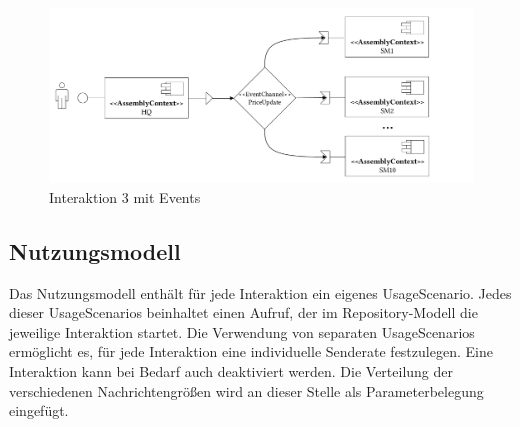 \begin{figure}
\center
  \includegraphics[width=1\textwidth]{images/evaluation/specjms/evaluationInteraktion3events.pdf}
  \caption{Interaktion 3 mit Events}
  \label{img:interaction3system}
\end{figure}


\subsection{Nutzungsmodell}
Das Nutzungsmodell enthält für jede Interaktion ein eigenes UsageScenario. Jedes dieser UsageScenarios beinhaltet einen Aufruf, der im Repository-Modell die jeweilige Interaktion startet. Die Verwendung von separaten UsageScenarios ermöglicht es, für jede Interaktion eine individuelle Senderate festzulegen. Eine Interaktion kann bei Bedarf auch deaktiviert werden. Die Verteilung der verschiedenen Nachrichtengrößen wird an dieser Stelle als Parameterbelegung eingefügt.

